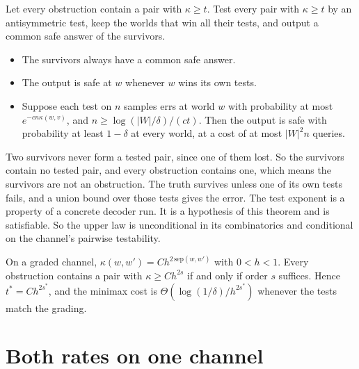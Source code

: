 \begin{theorem}
\label{thm:upper}
Let every obstruction contain a pair with $\kappa\ge t$. Test every pair with $\kappa\ge t$ by
an antisymmetric test, keep the worlds that win all their tests, and output a common safe
answer of the survivors.
\begin{itemize}
\item The survivors always have a common safe answer.
\item The output is safe at $w$ whenever $w$ wins its own tests.
\item Suppose each test on $n$ samples errs at world $w$ with probability at most
$e^{-cn\kappa(w,v)}$, and $n\ge\log(|W|/\delta)/(ct)$. Then the output is safe with probability
at least $1-\delta$ at every world, at a cost of at most $|W|^{2}n$ queries.
\end{itemize}
\end{theorem}


Two survivors never form a tested pair, since one of them lost. So the survivors contain no
tested pair, and every obstruction contains one, which means the survivors are not an
obstruction. The truth survives unless one of its own tests fails, and a union bound over those
tests gives the error. The test exponent is a property of a concrete decoder run. It is a
hypothesis of this theorem and is satisfiable. So the upper law is unconditional in its
combinatorics and conditional on the channel's pairwise testability.

\begin{theorem}
\label{thm:order}
On a graded channel, $\kappa(w,w')=Ch^{2\,\mathrm{sep}(w,w')}$ with $0<h<1$. Every obstruction
contains a pair with $\kappa\ge Ch^{2s}$ if and only if order $s$ suffices. Hence
$t^{*}=Ch^{2s^{*}}$, and the minimax cost is $\Theta(\log(1/\delta)/h^{2s^{*}})$ whenever the
tests match the grading.
\end{theorem}


\section{Both rates on one channel}
\label{sec:parity}

